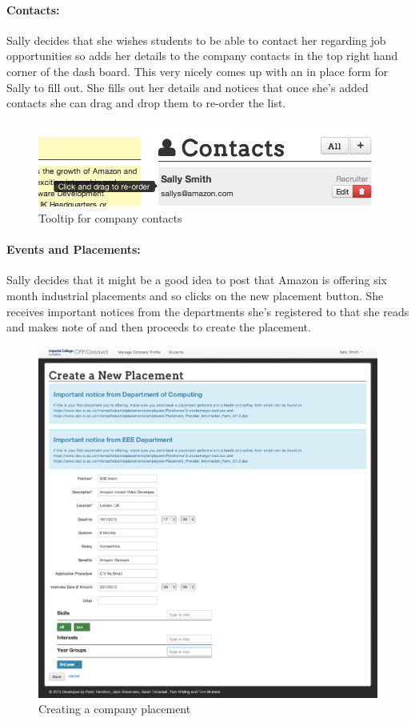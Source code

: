   \paragraph{Contacts:}
    Sally decides that she wishes students to be able to contact her regarding job opportunities so adds her details to the company contacts in the top right hand corner of the dash board. This very nicely comes up with an in place form for Sally to fill out.
    She fills out her details and notices that once she's added contacts she can drag and drop them to re-order the list.

    \begin{figure}[H]\centering
    \includegraphics[scale=0.6]{images/user_experiences/company/contact_drag_and_drop}
    \caption{Tooltip for company contacts}
    \end{figure}

  \paragraph{Events and Placements:}
    Sally decides that it might be a good idea to post that Amazon is offering six month industrial placements and so clicks on the new placement button.
    She receives important notices from the departments she's registered to that she reads and makes note of and then proceeds to create the placement.

    \begin{figure}[H]\centering
    \includegraphics[scale=0.5]{images/user_experiences/company/new_placement}
    \caption{Creating a company placement}
    \end{figure}

